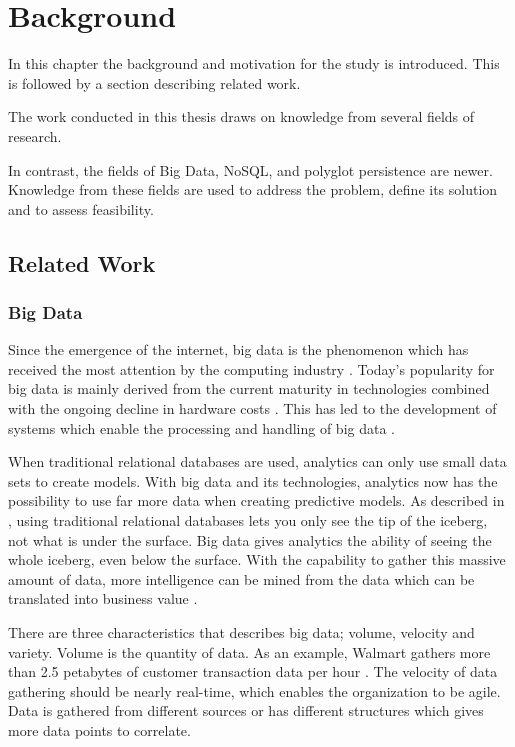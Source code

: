 \chapter{Background}
\label{chap:background}
In this chapter the background and motivation for the study is introduced. This is followed by a section describing related work.

The work conducted in this thesis draws on knowledge from several fields of research. 

In contrast, the fields of Big Data, NoSQL, and polyglot persistence are newer. Knowledge from these fields are used to address the problem, define its solution and to assess feasibility. 


\section{Related Work}

\subsection{Big Data}
Since the emergence of the internet, big data is the phenomenon which has received the most attention by the computing industry \cite{bigDataWarehouse}. Today's popularity for big data is mainly derived from the current maturity in technologies combined with the ongoing decline in hardware costs \cite{bigDataWarehouse, bigDatabigAn}. This has led to the development of systems which enable the processing and handling of big data \cite{bigDataWarehouse}.

When traditional relational databases are used, analytics can only use small data sets to create models. With big data and its technologies, analytics now has the possibility to use far more data when creating predictive models. As described in \cite{bigDatabigAn}, using traditional relational databases lets you only see the tip of the iceberg, not what is under the surface. Big data gives analytics the ability of seeing the whole iceberg, even below the surface. With the capability to gather this massive amount of data, more intelligence can be mined from the data which can be translated into business value \cite{bigDataMane}.

There are three characteristics that describes big data; volume, velocity and variety. Volume is the quantity of data. As an example, Walmart gathers more than 2.5 petabytes of customer transaction data per hour \cite{bigDataMane}. The velocity of data gathering should be nearly real-time, which enables the organization to be agile. Data is gathered from different sources or has different structures which gives more data points to correlate.

